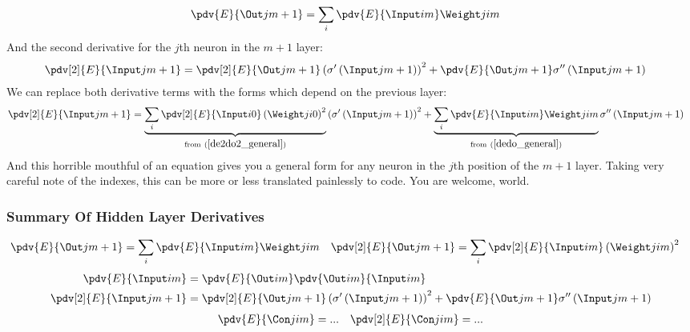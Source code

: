 \begin{align}
\pdv{E}{\Out j {m+1}} &= \sum_i\pdv{E}{\Input i m}\Weight j i m
\end{align}
And the second derivative for the $j$th neuron in the $m+1$ layer:
\begin{align}
\pdv[2]{E}{{\Input j {m+1}}} &= 
\pdv[2]{E}{{\Out j {m+1}}}
\left(\sigma^{\prime}\left({\Input j {m+1}}\right)\right)^2
+
\pdv{E}{{\Out j {m+1}}}\sigma^{\prime\prime}\left(\Input j {m+1}\right)
\end{align}
We can replace both derivative terms with the forms which depend on the previous layer:
\begin{align}
\pdv[2]{E}{{\Input j {m+1}}} &= 
\underbrace{\sum_i\pdv[2]{E}{{\Input i 0}} \left({\Weight j i 0}\right)^2}
_{\text{from} \ (\ref{de2do2_general})}
\left(\sigma^{\prime}\left({\Input j {m+1}}\right)\right)^2
+
\underbrace{\sum_i\pdv{E}{\Input i m}\Weight j i m}
_{\text{from} \ (\ref{dedo_general})}
\sigma^{\prime\prime}\left(\Input j {m+1}\right)
\end{align}
And this horrible mouthful of an equation gives you a general form for any neuron in the $j$th position of the $m+1$ layer. Taking very careful note of the indexes, this can be more or less translated painlessly to code. You are welcome, world.

\subsubsection{Summary Of Hidden Layer Derivatives}
\begin{align}
\pdv{E}{\Out j {m+1}} &= \sum_i\pdv{E}{\Input i m}\Weight j i m &
\pdv[2]{E}{{\Out j {m+1}}} &= 
\sum_i\pdv[2]{E}{{\Input i m}} \left({\Weight j i m}\right)^2
\end{align}
\begin{align}
\pdv{E}{\Input i m} &= 
\pdv{E}{\Out i m}
\pdv{\Out i m}{\Input i m} \\
\pdv[2]{E}{{\Input j {m+1}}} &= 
\pdv[2]{E}{{\Out j {m+1}}}
\left(\sigma^{\prime}\left({\Input j {m+1}}\right)\right)^2
+
\pdv{E}{{\Out j {m+1}}}\sigma^{\prime\prime}\left(\Input j {m+1}\right)
\end{align}
\begin{align}
&\pdv{E}{{\Con j i m}} = ...
&
\pdv[2]{E}{{\Con j i m}} = ...
\end{align}